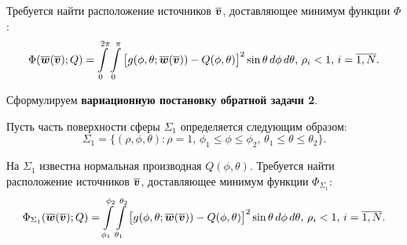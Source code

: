 Требуется найти расположение источников $\boldsymbol{\overline{v}}$, доставляющее минимум функции $\Phi$:
\begin{align}
	\Phi(\boldsymbol{\overline{w}}(\boldsymbol{\overline{v}}); Q) =
	\int\limits_{0}^{2\pi}\int\limits_{0}^{\pi}
	\big[g(\phi, \theta; \boldsymbol{\overline{w}}(\boldsymbol{\overline{v}})) - Q(\phi,\theta)\big]^2 
	\sin{\theta} \, d\phi \, d\theta \text{, }
	\rho_i < 1\text{, }
	i=\overline{1,N}
	\text{.}
\end{align}

\newpage
Сформулируем \textbf{вариационную постановку обратной задачи 2}.

Пусть часть поверхности сферы $\Sigma_1$ определяется следующим образом:
\begin{equation}
	\Sigma_1 = \{(\rho,\phi,\theta): \rho=1\text{, }
	\phi_1 \le \phi \le \phi_2\text{, }
	\theta_1 \le \theta \le \theta_2 \}\text{.}
\end{equation}


На $\Sigma_1$ известна нормальная производная $Q(\phi, \theta)$. Требуется найти расположение источников $\boldsymbol{\overline{v}}$, доставляющее минимум функции $\Phi_{\Sigma_1}$:
\begin{align}
	\Phi_{\Sigma_1}(\boldsymbol{\overline{w}}(\boldsymbol{\overline{v}}); Q) =
	\int\limits_{\phi_1}^{\phi_2}
	\int\limits_{\theta_1}^{\theta_2}
	\big[g(\phi, \theta; \boldsymbol{\overline{w}}(\boldsymbol{\overline{v}})) - Q(\phi,\theta)\big]^2 
	\sin\theta \, d\phi \, d\theta \text{, }
	\rho_i < 1\text{, }
	i=\overline{1,N}
	\text{.}
\end{align}